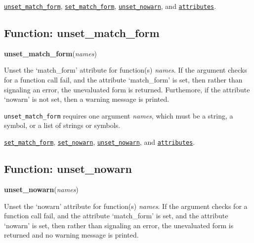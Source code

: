 \documentclass[]{article}
\begin{document}
\vspace{5 pt}


  \hyperlink{unset_match_form}{{\tt unset\_match\_form}}, \hyperlink{set_match_form}{{\tt set\_match\_form}}, \hyperlink{unset_nowarn}{{\tt unset\_nowarn}}, and \hyperlink{attributes}{{\tt attributes}}.

\vspace{5 pt}


\subsection{Function: unset\_match\_form\label{sec:unset_match_form}}
\hypertarget{unset_match_form}{}
{\bf unset\_match\_form}({\it names})



\vspace{5 pt}
Unset the `match\_form' attribute for function(s) {\it names}. If the argument checks for a function call fail, and the attribute `match\_form' is set, then rather than signaling an error, the unevaluated form is returned. Furthemore, if the attribute `nowarn' is not set, then a warning message is 
printed. 

\vspace{5 pt}

   {\tt unset\_match\_form} requires one argument {\it names}, which must be  a string, a symbol, or a list of strings or symbols.


\vspace{5 pt}


  \hyperlink{set_match_form}{{\tt set\_match\_form}}, \hyperlink{set_nowarn}{{\tt set\_nowarn}}, \hyperlink{unset_nowarn}{{\tt unset\_nowarn}}, and \hyperlink{attributes}{{\tt attributes}}.

\vspace{5 pt}


\subsection{Function: unset\_nowarn\label{sec:unset_nowarn}}
\hypertarget{unset_nowarn}{}
{\bf unset\_nowarn}({\it names})



\vspace{5 pt}
Unset the `nowarn' attribute for function(s) {\it names}. If the argument checks for a function call fail, and the attribute `match\_form' is set, and the attribute `nowarn' is set, then rather than signaling an error, the unevaluated form is returned and no warning message is printed. 
\end{document}

